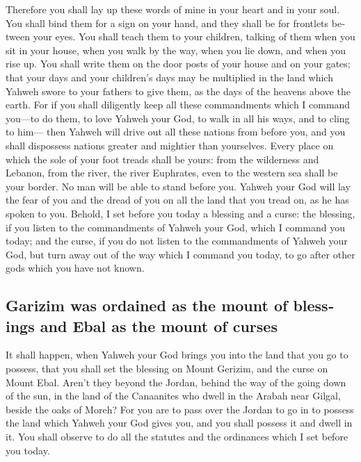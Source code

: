 \begin{paracol}{2}
\begin{otherlanguage}{english}
 Therefore you shall lay up these words of mine in your
heart and in your soul. You shall bind them for a sign on your hand, and
they shall be for frontlets between your eyes.  You shall
teach them to your children, talking of them when you sit in your house,
when you walk by the way, when you lie down, and when you rise up.
 You shall write them on the door posts of your house and
on your gates;  that your days and your children's days
may be multiplied in the land which Yahweh swore to your fathers to give
them, as the days of the heavens above the earth.  For if
you shall diligently keep all these commandments which I command
you---to do them, to love Yahweh your God, to walk in all his ways, and
to cling to him---  then Yahweh will drive out all these
nations from before you, and you shall dispossess nations greater and
mightier than yourselves.  Every place on which the sole
of your foot treads shall be yours: from the wilderness and Lebanon,
from the river, the river Euphrates, even to the western sea shall be
your border.  No man will be able to stand before you.
Yahweh your God will lay the fear of you and the dread of you on all the
land that you tread on, as he has spoken to you.  Behold,
I set before you today a blessing and a curse:  the
blessing, if you listen to the commandments of Yahweh your God, which I
command you today;  and the curse, if you do not listen
to the commandments of Yahweh your God, but turn away out of the way
which I command you today, to go after other gods which you have not
known.

\hypertarget{garizim-was-ordained-as-the-mount-of-blessings-and-ebal-as-the-mount-of-curses}{%
\subsection{Garizim was ordained as the mount of blessings and Ebal as
the mount of
curses}\label{garizim-was-ordained-as-the-mount-of-blessings-and-ebal-as-the-mount-of-curses}}

 It shall happen, when Yahweh your God brings you into
the land that you go to possess, that you shall set the blessing on
Mount Gerizim, and the curse on Mount Ebal.  Aren't they
beyond the Jordan, behind the way of the going down of the sun, in the
land of the Canaanites who dwell in the Arabah near Gilgal, beside the
oaks of Moreh?  For you are to pass over the Jordan to go
in to possess the land which Yahweh your God gives you, and you shall
possess it and dwell in it.  You shall observe to do all
the statutes and the ordinances which I set before you today.


\end{otherlanguage}
\end{paracol}
